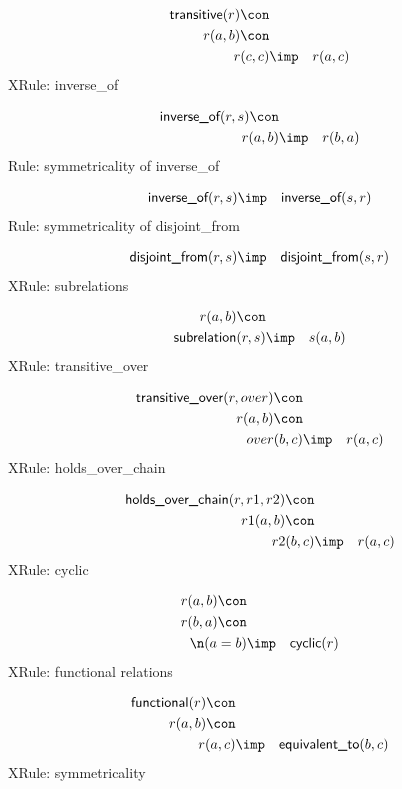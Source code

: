 \begin{eqnarray*}
 \pr{transitive}(r) \con \\
r(a, b) \con \\
r(c, c) &\imp &r(a, c) 
\end{eqnarray*}
XRule: inverse\_of

\begin{eqnarray*}
 \pr{inverse\_of}(r, s) \con \\
r(a, b) &\imp &r(b, a) 
\end{eqnarray*}
Rule: symmetricality of inverse\_of

\begin{eqnarray*}
 \pr{inverse\_of}(r, s) &\imp & \pr{inverse\_of}(s, r) 
\end{eqnarray*}
Rule: symmetricality of disjoint\_from

\begin{eqnarray*}
 \pr{disjoint\_from}(r, s) &\imp & \pr{disjoint\_from}(s, r) 
\end{eqnarray*}
XRule: subrelations

\begin{eqnarray*}
r(a, b) \con \\
 \pr{subrelation}(r, s) &\imp &s(a, b) 
\end{eqnarray*}
XRule: transitive\_over

\begin{eqnarray*}
 \pr{transitive\_over}(r, over) \con \\
r(a, b) \con \\
over(b, c) &\imp &r(a, c) 
\end{eqnarray*}
XRule: holds\_over\_chain

\begin{eqnarray*}
 \pr{holds\_over\_chain}(r, r1, r2) \con \\
r1(a, b) \con \\
r2(b, c) &\imp &r(a, c) 
\end{eqnarray*}
XRule: cyclic

\begin{eqnarray*}
r(a, b) \con \\
r(b, a) \con \\
 \n(a = b)&\imp & \pr{cyclic}(r) 
\end{eqnarray*}
XRule: functional relations

\begin{eqnarray*}
 \pr{functional}(r) \con \\
r(a, b) \con \\
r(a, c) &\imp & \pr{equivalent\_to}(b, c) 
\end{eqnarray*}
XRule: symmetricality

